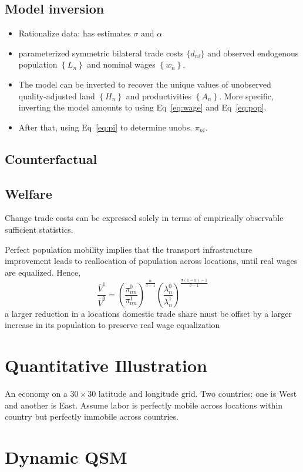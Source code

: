 \documentclass[11pt,a4paper]{article}
\begin{document}
\subsection{Model inversion}
\begin{itemize}
  \item Rationalize data: has estimates $\sigma $ and $\alpha $
  \item parameterized symmetric bilateral trade costs $\{d_{ni}\}$ and observed endogenous population $\left\{ L_n \right\}$ and nominal wages $\left\{ w_n \right\}$.
  \item The model can be inverted to recover the unique values of unobserved quality-adjusted land $\left\{ H_n \right\}$ and productivities $\left\{ A_n \right\}$. More specific, inverting the model amounts to using Eq~\eqref{eq:wage} and Eq~\eqref{eq:pop}. 
  \item After that, using Eq~\eqref{eq:pi} to determine unobs. $\pi _{ni}$.
\end{itemize}


\subsection{Counterfactual}


\subsection{Welfare}
Change trade costs can be expressed solely in terms of empirically observable sufficient statistics. 

Perfect population mobility implies that the transport infrastructure improvement leads to reallocation of population across locations, until real wages are equalized. Hence, \begin{equation}
  \frac{\bar{V}^1 }{\bar{V}^0} = \left( \frac{\pi _{nn}^0}{\pi _{nn}^1} \right)^{\frac{\alpha }{\sigma -1}} \left( \frac{\lambda _n^0}{\lambda _n^1} \right)^{\frac{\sigma (1-\alpha ) - 1}{\sigma -1}}
\end{equation}
a larger reduction in a locations domestic trade share must be offset by a larger increase in its population to preserve real wage equalization


\section{Quantitative Illustration}
An economy on a $30 \times 30$ latitude and longitude grid. 
Two countries: one is West and another is East. 
Assume labor is perfectly mobile across locations within country but perfectly immobile across countries. 


\section{Dynamic QSM}
\end{document}
